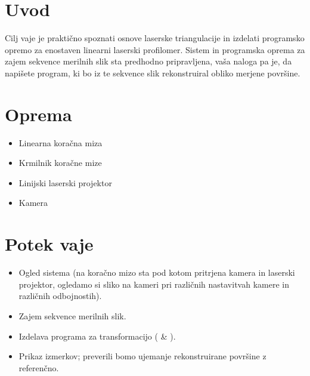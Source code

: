 \documentclass[letterpaper,10pt,english]{sphinxmanual}
\begin{document}
\section{Uvod}
\label{\detokenize{laserskiprofilomer:uvod}}
\sphinxAtStartPar
Cilj vaje je praktično spoznati osnove laserske triangulacije in izdelati programsko opremo za enostaven linearni laserski profilomer. Sistem in programska oprema za zajem sekvence merilnih slik sta predhodno pripravljena, vaša naloga pa je, da napišete program, ki bo iz te sekvence slik rekonstruiral obliko merjene površine.


\section{Oprema}
\label{\detokenize{laserskiprofilomer:oprema}}\begin{itemize}
\item {} 
\sphinxAtStartPar
Linearna koračna miza

\item {} 
\sphinxAtStartPar
Krmilnik koračne mize

\item {} 
\sphinxAtStartPar
Linijski laserski projektor

\item {} 
\sphinxAtStartPar
Kamera

\end{itemize}


\section{Potek vaje}
\label{\detokenize{laserskiprofilomer:potek-vaje}}\begin{itemize}
\item {} 
\sphinxAtStartPar
Ogled sistema (na koračno mizo sta pod kotom pritrjena kamera in laserski projektor, ogledamo si sliko na kameri pri različnih nastavitvah kamere in različnih odbojnostih).

\item {} 
\sphinxAtStartPar
Zajem sekvence merilnih slik.

\item {} 
\sphinxAtStartPar
Izdelava programa za transformacijo (  \&  ).

\item {} 
\sphinxAtStartPar
Prikaz izmerkov; preverili bomo ujemanje rekonstruirane površine z referenčno.

\end{itemize}
\end{document}
